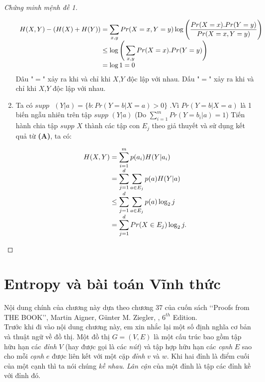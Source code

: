 \documentclass[a4paper, 12pt]{report}
\begin{document}
\begin{proof}[Chứng minh mệnh đề 1]
\begin{enumerate}[label=(\Alph*)]
\begin{equation*}
\begin{array}{l@{}l}
H(X,Y) - (H(X) + H(Y)) 
	&{}= \displaystyle \sum_{x,y}Pr(X=x,Y=y)\log\Bigg(\frac{Pr(X=x).Pr(Y=y)}{Pr(X=x,Y=y)}\Bigg) \\
	&{}\leq \log \Bigg( \displaystyle \sum_{x,y}Pr(X=x).Pr(Y=y)\Bigg)\\
	&{}= \log 1 =0 
\end{array}
\end{equation*}
Dâu "$=$" xảy ra khi và chỉ khi $X$,$Y$ độc lập với nhau.
Dấu "$=$" xảy ra  khi và chỉ khi $X$,$Y$ độc lập với nhau.

\item Ta có $supp\textrm{ }(Y|a) = \{b: Pr(Y=b|X=a) > 0 \}$ .Vì $Pr(Y=b|X=a)$ là 1 biến ngẫu nhiên trên tập $supp$ $(Y|a)$ (Do $\displaystyle \sum_{i=1}^{m}Pr(Y=b_{i}|a) =1$) Tiến hành chia tập $supp$ $X$ thành các tập con $E_{j}$ theo giả thuyết và sử dụng kết quả từ \textbf{(A)}, ta có:

\begin{equation*}
\begin{array}{l@{}l}
H(X,Y)
	&{} = \displaystyle \sum_{i=1}^{m}p(a_{i})H(Y|a_{i}) \\
	&{}= \displaystyle \sum _{j=1}^{d}\sum_{a \in E_{j}}p(a)H(Y|a) \\
	&{} \leq \displaystyle \sum _{j=1}^{d}\sum_{a \in E_{j}}p(a)\log_{2}j \\
	&{} = \displaystyle \sum_{j=1}^{d}Pr(X \in E_{j})\log_{2}j.
\end{array}
\end{equation*}
\end{enumerate}
\end{proof}



\chapter{Entropy và bài toán Vĩnh thức}
Nội dung chính của chương này dựa theo chương 37 của cuốn sách ‘‘Proofs from THE BOOK’’, Martin Aigner, Günter M. Ziegler, , $6^{th}$ Edition.\\
Trước khi đi vào nội dung chương này, em xin nhắc lại một số định nghĩa cơ bản và thuật ngữ về đồ thị. Một đồ thị $G = (V,E)$ là một cấu trúc bao gồm tập hữu hạn các \textit{đỉnh} $V$ (hay được gọi là các \textit{nút}) và tập hợp hữu hạn các \textit{cạnh} $E$ sao cho mỗi \textit{cạnh} $e$ được liên kết với một cặp \textit{đỉnh} $v$ và $w$. Khi hai đỉnh là điểm cuối của một cạnh thì ta nói chúng \textit{kề nhau}. \textit{Lân cận} của một đỉnh là tập các đỉnh kề với đỉnh đó.
\end{document}
